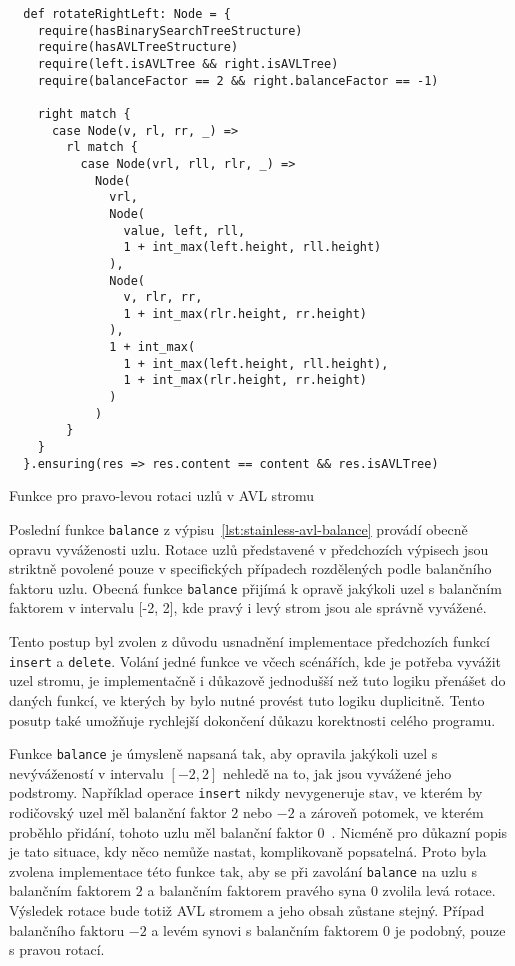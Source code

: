 \begin{listing}[H]
  \begin{verbatim}
  def rotateRightLeft: Node = {
    require(hasBinarySearchTreeStructure)
    require(hasAVLTreeStructure)
    require(left.isAVLTree && right.isAVLTree)
    require(balanceFactor == 2 && right.balanceFactor == -1)

    right match {
      case Node(v, rl, rr, _) =>
        rl match {
          case Node(vrl, rll, rlr, _) =>
            Node(
              vrl,
              Node(
                value, left, rll,
                1 + int_max(left.height, rll.height)
              ),
              Node(
                v, rlr, rr,
                1 + int_max(rlr.height, rr.height)
              ),
              1 + int_max(
                1 + int_max(left.height, rll.height),
                1 + int_max(rlr.height, rr.height)
              )
            )
        }
    }
  }.ensuring(res => res.content == content && res.isAVLTree)
  \end{verbatim}
  \caption{Funkce pro pravo-levou rotaci uzlů v AVL stromu}
  \label{lst:stainless-avl-rotateRightLeft}
\end{listing}

Poslední funkce \texttt{balance} z výpisu~\ref{lst:stainless-avl-balance}
provádí obecně opravu vyváženosti uzlu.
Rotace uzlů představené v předchozích výpisech
jsou striktně povolené pouze v specifických případech rozdělených podle
balančního faktoru uzlu.
Obecná funkce \texttt{balance} přijímá k opravě jakýkoli uzel s balančním faktorem
v intervalu [-2, 2], kde pravý i levý strom jsou ale správně vyvážené.

Tento postup byl zvolen z důvodu usnadnění implementace předchozích funkcí \texttt{insert} a \texttt{delete}.
Volání jedné funkce ve včech scénářích, kde je potřeba vyvážit uzel stromu,
je implementačně i důkazově jednodušší než tuto logiku přenášet do daných funkcí,
ve kterých by bylo nutné provést tuto logiku duplicitně.
Tento posutp také umožňuje rychlejší dokončení důkazu korektnosti celého programu.

Funkce \texttt{balance} je úmysleně napsaná tak, aby opravila
jakýkoli uzel s nevývážeností v intervalu $[-2, 2]$ nehledě na to,
jak jsou vyvážené jeho podstromy.
Například operace \texttt{insert} nikdy nevygeneruje stav,
ve kterém by rodičovský uzel měl balanční faktor $2$ nebo $-2$
a zároveň potomek, ve kterém proběhlo přidání, tohoto uzlu měl balanční faktor $0$~\cite{Pruvodce22}.
Nicméně pro důkazní popis je tato situace, kdy něco nemůže nastat,
komplikovaně popsatelná.
Proto byla zvolena implementace této funkce tak,
aby se při zavolání \texttt{balance} na uzlu s balančním faktorem $2$ a balančním faktorem pravého syna $0$
zvolila levá rotace.
Výsledek rotace bude totiž AVL stromem a jeho obsah zůstane stejný.
Případ balančního faktoru $-2$ a levém synovi s balančním faktorem $0$ je podobný,
pouze s pravou rotací.

